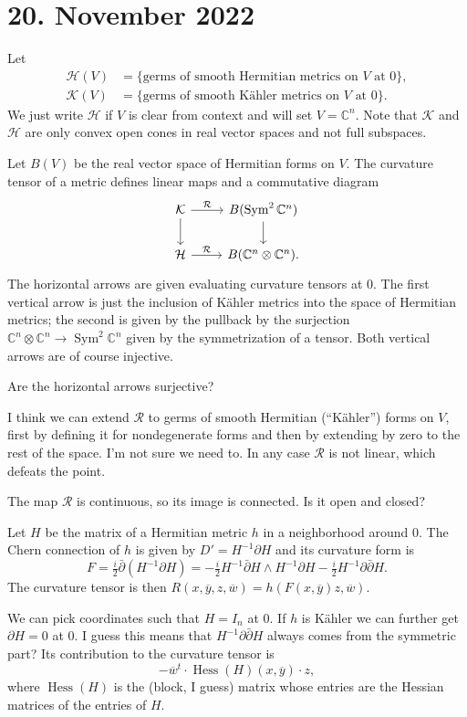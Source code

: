 \documentclass[11pt]{amsart}
\theoremstyle{definition}
\newcommand{\kk}[1]{\mathbb{#1}}
\newcommand{\cc}[1]{\mathcal{#1}}
\def\ov#1{\overline{#1}}
\begin{document}
\section{20. November 2022}

Let
\begin{align*}
\cc H(V)
&= \{ \text{germs of smooth Hermitian metrics on $V$ at $0$} \},
\\
\cc K(V)
&= \{ \text{germs of smooth K\"ahler metrics on $V$ at $0$} \}.
\end{align*}
We just write $\cc H$ if $V$ is clear from context and will set $V = \kk C^n$.
Note that $\cc K$ and $\cc H$ are only convex open cones in real vector spaces
and not full subspaces.

Let $B(V)$ be the real vector space of Hermitian forms on $V$.
The curvature tensor of a metric defines linear maps
and a commutative diagram
$$
\begin{tikzcd}
\cc K \ar[d] \ar[r,"\cc R"] & B(\operatorname{Sym}^2 \kk C^n)\ar[d]
\\
\cc H \ar[r, "\cc R"] & B(\kk C^n \otimes \kk C^n).
\end{tikzcd}
$$
The horizontal arrows are given evaluating curvature tensors at $0$.
The first vertical arrow is just the inclusion of K\"ahler metrics into the
space of Hermitian metrics; the second is given by the pullback by the surjection
$\kk C^n \otimes \kk C^n \to \operatorname{Sym}^2 \kk C^n$
given by the symmetrization of a tensor.
Both vertical arrows are of course injective.

Are the horizontal arrows surjective?

I think we can extend $\cc R$ to germs of smooth Hermitian (``K\"ahler'') forms
on $V$, first by defining it for nondegenerate forms and then by extending by
zero to the rest of the space. I'm not sure we need to.
In any case $\cc R$ is not linear, which defeats the point.

The map $\cc R$ is continuous, so its image is connected.
Is it open and closed?

Let $H$ be the matrix of a Hermitian metric $h$ in a neighborhood around $0$.
The Chern connection of $h$ is given by $D' = H^{-1}\partial H$ and its
curvature form is
$$
F = \tfrac i2 \bar\partial(H^{-1}\partial H)
= - \tfrac i2 H^{-1} \bar\partial H \wedge H^{-1} \partial H
- \tfrac i2 H^{-1} \partial \bar\partial H.
$$
The curvature tensor is then $R(x,\ov y, z, \ov w) = h(F(x, \ov y) z, \ov w)$.

We can pick coordinates such that $H = I_n$ at $0$.
If $h$ is K\"ahler we can further get $\partial H = 0$ at $0$.
I guess this means that $H^{-1}\partial \bar\partial H$ always comes from the
symmetric part?
Its contribution to the curvature tensor is
$$
- \ov w^t \cdot \operatorname{Hess}(H)(x, \ov y) \cdot z,
$$
where $\operatorname{Hess}(H)$ is the (block, I guess) matrix whose entries are
the Hessian matrices of the entries of $H$.
\end{document}
